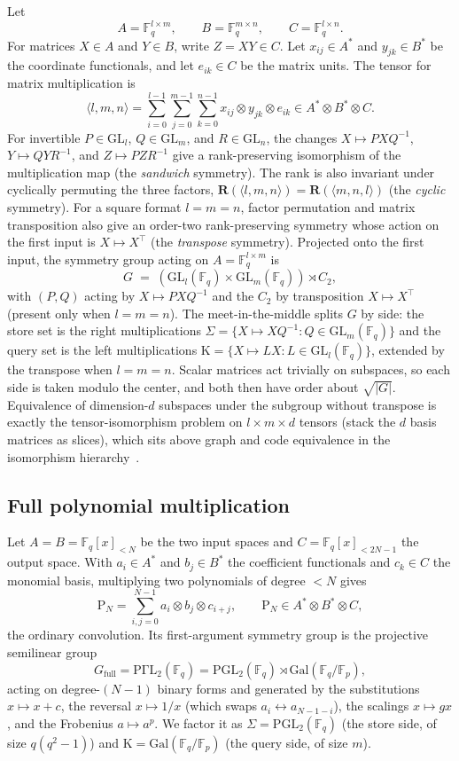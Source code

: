 \documentclass[11pt]{article}
\theoremstyle{definition}
\newcommand{\F}{\mathbb{F}}
\newcommand{\R}{\mathbf{R}}
\newcommand{\Fullt}[1]{\mathrm{P}_{#1}}
\newcommand{\GL}{\mathrm{GL}}
\newcommand{\PGL}{\mathrm{PGL}}
\newcommand{\Gal}{\mathrm{Gal}}
\newcommand{\Kappa}{\mathrm{K}}
\newcommand{\mmt}[3]{\langle #1,#2,#3\rangle}
\begin{document}
Let
\[
  A=\F_q^{l\times m},\qquad B=\F_q^{m\times n},\qquad
  C=\F_q^{l\times n}.
\]
For matrices $X\in A$ and $Y\in B$, write $Z=XY\in C$. Let $x_{ij}\in A^*$
and $y_{jk}\in B^*$ be the coordinate functionals, and let $e_{ik}\in C$ be
the matrix units. The tensor for matrix multiplication is
\[
  \mmt{l}{m}{n} = \sum_{i=0}^{l-1}\sum_{j=0}^{m-1}\sum_{k=0}^{n-1}
  x_{ij}\otimes y_{jk}\otimes e_{ik}
  \in A^*\otimes B^*\otimes C.
\]
For invertible $P\in\GL_l$, $Q\in\GL_m$, and $R\in\GL_n$, the changes
$X\mapsto PXQ^{-1}$, $Y\mapsto QYR^{-1}$, and $Z\mapsto PZR^{-1}$ give a
rank-preserving isomorphism of the multiplication map (the \emph{sandwich}
symmetry). The rank is also invariant under
cyclically permuting the three factors, $\R(\mmt{l}{m}{n})=\R(\mmt{m}{n}{l})$ (the
\emph{cyclic} symmetry). For a square format $l=m=n$, factor permutation and
matrix transposition also give an order-two rank-preserving symmetry whose
action on the first input is $X\mapsto X^{\!\top}$ (the \emph{transpose}
symmetry). Projected onto the first input, the symmetry group acting on
$A=\F_q^{l\times m}$ is
\[
  G \;=\; (\GL_l(\F_q)\times \GL_m(\F_q)) \rtimes C_2,
\]
with $(P,Q)$ acting by $X\mapsto PXQ^{-1}$ and the $C_2$ by transposition $X\mapsto X^{\!\top}$ (present
only when $l=m=n$). The meet-in-the-middle splits $G$ by side:
the store set is the right multiplications $\Sigma=\{X\mapsto XQ^{-1}:Q\in\GL_m(\F_q)\}$ and
the query set is the left multiplications $\Kappa=\{X\mapsto LX:L\in\GL_l(\F_q)\}$,
extended by the transpose when $l=m=n$. Scalar matrices act trivially on subspaces,
so each side is taken modulo the center, and both then have order about $\sqrt{|G|}$.
Equivalence of dimension-$d$ subspaces under the subgroup without transpose is
exactly the tensor-isomorphism problem on $l\times m\times d$ tensors (stack the
$d$ basis matrices as slices), which sits above graph
and code equivalence in the isomorphism hierarchy~\cite{grochow2023complexity}.

\subsection{Full polynomial multiplication}

Let $A=B=\F_q[x]_{<N}$ be the two input spaces and
$C=\F_q[x]_{<2N-1}$ the output space. With $a_i\in A^*$ and $b_j\in B^*$ the
coefficient functionals and $c_k\in C$ the monomial basis, multiplying two
polynomials of degree $<N$ gives
\[
  \Fullt{N} = \sum_{i,j=0}^{N-1} a_i\otimes b_j\otimes c_{i+j},
  \qquad \Fullt{N}\in A^*\otimes B^*\otimes C,
\]
the ordinary convolution. Its first-argument symmetry group is the projective
semilinear group
\[
  G_{\mathrm{full}} = \mathrm{P\Gamma L}_2(\F_q)
  = \PGL_2(\F_q)\rtimes \Gal(\F_q/\F_p),
\]
acting on degree-$(N-1)$ binary forms and generated by the substitutions
$x\mapsto x+c$, the reversal $x\mapsto 1/x$ (which
swaps $a_i\leftrightarrow a_{N-1-i}$), the scalings $x\mapsto gx$, and the
Frobenius $a\mapsto a^p$. We factor it as
$\Sigma=\PGL_2(\F_q)$ (the store side, of size $q(q^2-1)$) and
$\Kappa=\Gal(\F_q/\F_p)$ (the query side, of size $m$).
\end{document}
